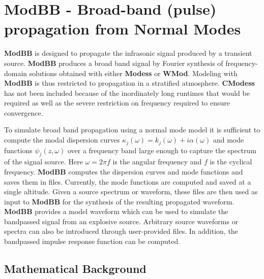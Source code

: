 
\section{ModBB - Broad-band (pulse) propagation from Normal Modes}

{\bf ModBB} is designed to propagate the infrasonic signal produced by a transient source. {\bf ModBB} produces a broad band signal by Fourier synthesis of frequency-domain solutions obtained with either {\bf Modess} or {\bf WMod}. Modeling with {\bf ModBB} is thus restricted to propagation in a stratified atmosphere. {\bf CModess} has not been included because of the inordinately long runtimes that would be required as well as the severe restriction on frequency required to ensure convergence. 

To simulate broad band propagation using a normal mode model it is sufficient to compute the modal dispersion curves $\kappa_j(\omega)=k_j(\omega)+i\alpha(\omega)$ and mode functions $\psi_j(z,\omega)$ over a frequency band large enough to capture the spectrum of the signal source. Here $\omega=2\pi f$ is the angular frequency and $f$ is the cyclical frequency. {\bf ModBB} computes the dispersion curves and mode functions and saves them in files. Currently, the mode functions are computed and saved at a single altitude. Given a source spectrum or waveform, these files are then used as input to {\bf ModBB} for the synthesis of the resulting propagated waveform. {\bf ModBB} provides a model waveform which can be used to simulate the bandpassed signal from an explosive source. Arbitrary source waveforms or spectra can also be introduced through user-provided files. In addition, the bandpassed impulse response function can be computed. 

\subsection{Mathematical Background}
\label{sec: modbb math}

